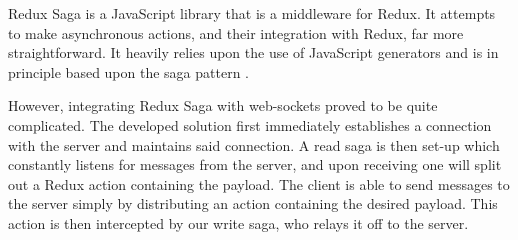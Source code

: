 \documentclass{standalone}
\begin{document}
			Redux Saga \parencite{reduxSaga} is a JavaScript library that is a middleware for Redux. It attempts to make asynchronous actions, and their integration with Redux, far more straightforward. It heavily relies upon the use of JavaScript generators and is in principle based upon the saga pattern \parencite{sagas}.

			However, integrating Redux Saga with web-sockets proved to be quite complicated. The developed solution first immediately establishes a connection with the server and maintains said connection. A read saga is then set-up which constantly listens for messages from the server, and upon receiving one will split out a Redux action containing the payload. The client is able to send messages to the server simply by distributing an action containing the desired payload. This action is then intercepted by our write saga, who relays it off to the server.
\end{document}
